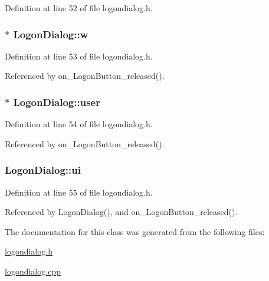 Definition at line 52 of file logondialog.h.\hypertarget{class_logon_dialog_1c32b591de3a058059ed985b5f470ca0}{
\subsubsection[w]{$\ast$ {\bf LogonDialog::w}}}
\label{class_logon_dialog_1c32b591de3a058059ed985b5f470ca0}




Definition at line 53 of file logondialog.h.

Referenced by on\_\-LogonButton\_\-released().\hypertarget{class_logon_dialog_60af9ce2cb403ef6ae38953b9c78e2ee}{
\subsubsection[user]{$\ast$ {\bf LogonDialog::user}}}
\label{class_logon_dialog_60af9ce2cb403ef6ae38953b9c78e2ee}




Definition at line 54 of file logondialog.h.

Referenced by on\_\-LogonButton\_\-released().\hypertarget{class_logon_dialog_24dfce9f2459f2c66f09a430d8baf907}{
\subsubsection[ui]{ {\bf LogonDialog::ui}}}
\label{class_logon_dialog_24dfce9f2459f2c66f09a430d8baf907}




Definition at line 55 of file logondialog.h.

Referenced by LogonDialog(), and on\_\-LogonButton\_\-released().

The documentation for this class was generated from the following files:\begin{CompactItemize}
\item 
\hyperlink{logondialog_8h}{logondialog.h}\item 
\hyperlink{logondialog_8cpp}{logondialog.cpp}\end{CompactItemize}
